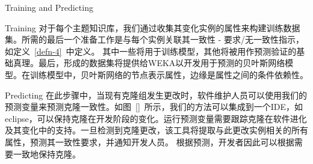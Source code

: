 {Training and Predicting} 

{Training} 
对于每个主题知识库，我们通过收集其变化实例的属性来构建训练数据集。所需的最后一个准备工作是与每个实例关联其一致性 - 要求/无一致性指示，如定义~\ref{defn-4}~中定义。 其中一些将用于训练模型，其他将被用作预测验证的基础真理。最后，形成的数据集将提供给WEKA以开发用于预测的贝叶斯网络模型。在训练模型中，贝叶斯网络的节点表示属性，边缘是属性之间的条件依赖性。


{Predicting} 
在此步骤中，当现有克隆组发生更改时，软件维护人员可以使用我们的预测变量来预测克隆一致性。如图~\ref{}~所示，我们的方法可以集成到一个IDE，如eclipse，可以保持克隆在开发阶段的变化。运行预测变量需要跟踪克隆在软件进化及其变化中的支持。一旦检测到克隆更改，该工具将提取与此更改实例相关的所有属性，预测其一致性要求，并通知开发人员。
根据预测，开发者因此可以根据需要一致地保持克隆。

